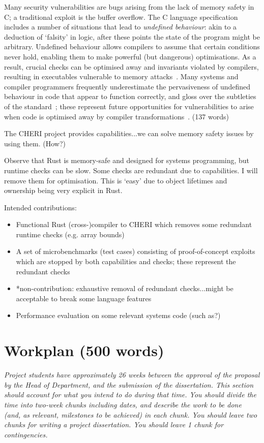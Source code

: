 \documentclass[11pt]{article}
\begin{document}
Many security vulnerabilities are bugs arising from the lack of memory safety in C; a traditional exploit is the buffer overflow.
The C language specification includes a number of situations that lead to \emph{undefined behaviour}: akin to a deduction of `falsity' in logic, after these points the state of the program might be arbitrary.
Undefined behaviour allows compilers to assume that certain conditions never hold, enabling them to make powerful (but dangerous) optimisations.
As a result, crucial checks can be optimised away and invariants violated by compilers, resulting in executables vulnerable to memory attacks~\cite{simon2018wygiwyc}.
Many systems and compiler programmers frequently underestimate the pervasiveness of undefined behaviour in code that appear to function correctly, and gloss over the subtleties of the standard~\cite{memarian2016cdepths};
these represent future opportunities for vulnerabilities to arise when code is optimised away by compiler transformations~\cite{wang2013towards}.
(137 words)

The CHERI project provides capabilities...we can solve memory safety issues by using them. (How?)

Observe that Rust is memory-safe and designed for systems programming, but runtime checks can be slow.
Some checks are redundant due to capabilities.
I will remove them for optimisation.
This is `easy' due to object lifetimes and ownership being very explicit in Rust.

Intended contributions:
\begin{itemize}
  \item Functional Rust (cross-)compiler to CHERI which removes some redundant runtime checks (e.g. array bounds)
  \item A set of microbenchmarks (test cases) consisting of proof-of-concept exploits which are stopped by both capabilities and checks; these represent the redundant checks
  \item *non-contribution: exhaustive removal of redundant checks...might be acceptable to break some language features
  \item Performance evaluation on some relevant systems code (such as?)
\end{itemize}

\section{Workplan (500 words)}
\textsl{Project students have approximately 26 weeks between the approval of 
the proposal by the Head of Department, and the submission of the dissertation. This section
should account for what you intend to do during that time. You should divide the time into two-week chunks including dates, and 
describe the work to be done (and, as relevant, milestones to be 
achieved) in each chunk. You should leave two 
chunks for writing a project dissertation. You should leave 1 chunk for contingencies.}
\end{document}
